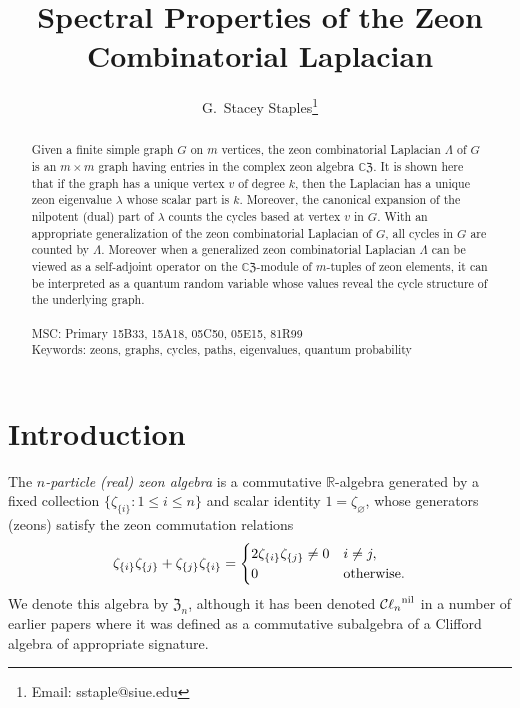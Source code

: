 \documentclass{article}
\theoremstyle{definition}
\newcommand{\CZ}{\mathbb{C}\mathfrak{Z}}
\newcommand{\Z}{\mathfrak{Z}}
\numberwithin{equation}{section}
\begin{document}
\title{Spectral Properties of the Zeon Combinatorial Laplacian}

\author{G.~Stacey Staples\footnote{Email: sstaple@siue.edu}}

\date{}  

\maketitle

\begin{abstract}
Given a finite simple graph $G$ on $m$ vertices, the zeon combinatorial Laplacian $\Lambda$ of $G$ is an $m\times m$ graph having entries in the complex zeon algebra $\CZ$.   It is shown here that if the graph has a unique vertex $v$ of degree $k$, then the Laplacian has a unique zeon eigenvalue $\lambda$ whose scalar part is $k$.  Moreover, the canonical expansion of the nilpotent (dual) part of $\lambda$ counts the cycles based at vertex $v$ in $G$.   With an appropriate generalization of the zeon combinatorial Laplacian of $G$, all cycles in $G$ are counted by  $\Lambda$.  Moreover when a generalized zeon combinatorial Laplacian $\Lambda$ can be viewed as a self-adjoint operator on the $\CZ$-module of $m$-tuples of zeon elements, it can be interpreted as a quantum random variable whose values reveal the cycle structure of the underlying graph.\\
\\
MSC: Primary 15B33, 15A18, 05C50, 05E15, 81R99
\\
Keywords: zeons, graphs, cycles, paths, eigenvalues, quantum probability
\end{abstract}


\section{Introduction}

The {\em $n$-particle (real) zeon algebra} is a commutative $\mathbb{R}$-algebra generated by a fixed collection  $\{\zeta_{\{i\}}:1\le i\le n\}$ and scalar identity $1=\zeta_\varnothing$, whose generators (zeons) satisfy the zeon commutation relations \begin{equation*}
\zeta_{\{i\}}\zeta_{\{j\}}+\zeta_{\{j\}}\zeta_{\{i\}}=\begin{cases}
2\zeta_{\{i\}}\zeta_{\{j\}}\ne 0& i\ne j,\\
0&\text{\rm otherwise.}
\end{cases}
\end{equation*}   
We denote this algebra by $\Z_n$, although it has been denoted ${\mathcal{C}\ell_n}^{\rm nil}$ in a number of earlier papers where it was defined as a commutative subalgebra of a Clifford algebra of appropriate signature.  
\end{document}
